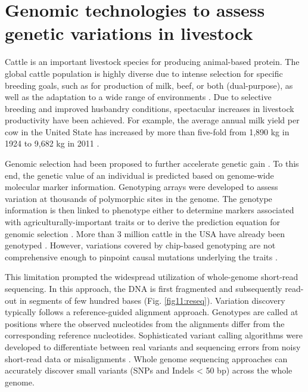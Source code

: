 \documentclass[../main.tex]{subfiles}
\begin{document}
\fi


\graphicspath{{figure/}{../figure/}}

\newpage
\onehalfspacing

\linespread{1.25}
\setlength{\parskip}{\baselineskip}

\normalsize

\section{Genomic technologies to assess genetic variations in livestock}

Cattle is an important livestock species for producing animal-based protein. The global cattle population is highly diverse due to intense selection for specific breeding goals, such as for production of milk, beef, or both (dual-purpose), as well as the adaptation to a wide range of environments \citep{zhang2020evolution}. Due to selective breeding and improved husbandry conditions, spectacular increases in livestock productivity have been achieved. For example, the average annual milk yield per cow in the United State has increased by more than five-fold from 1,890 kg in 1924 to 9,682 kg in 2011 \citep{georges2019harnessing}. 

Genomic selection had been proposed to further accelerate genetic gain \citep{meuwissen2001prediction}. To this end, the genetic value of an individual is predicted based on genome-wide molecular marker information. Genotyping arrays were developed to assess variation at thousands of polymorphic sites in the genome. The genotype information is then linked to phenotype either to determine markers associated with agriculturally-important traits \citep{goddard2009mapping} or to derive the prediction equation for genomic selection \citep{meuwissen2001prediction}. More than 3 million cattle in the USA have already been genotyped \citep{wiggans2017genomic}. However, variations covered by chip-based genotyping  are  not comprehensive enough  to pinpoint causal mutations underlying the traits \citep{pausch2017evaluation}.

This limitation prompted the widespread utilization of whole-genome short-read sequencing. In this approach, the DNA is first fragmented and subsequently read-out in segments of few hundred bases (Fig. \ref{fig11:reseq}). Variation discovery typically follows a reference-guided alignment approach. Genotypes are called at positions where the observed nucleotides from the alignments differ from the corresponding reference nucleotides. Sophisticated variant calling algorithms were developed to differentiate between real variants and sequencing errors from noisy short-read data or misalignments \citep{depristo2011framework}. Whole genome sequencing approaches can accurately discover small variants (SNPs and Indels < 50 bp) across the whole genome. 
\end{document}
